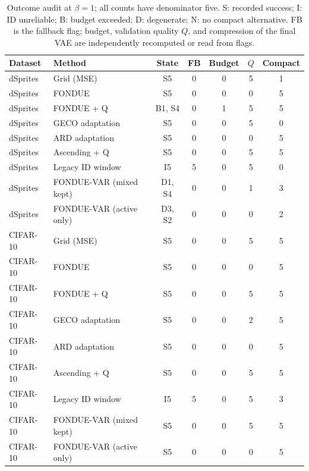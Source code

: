 \begin{table}[H]
\caption{Outcome audit at $\beta=1$; all counts have denominator five. S: recorded success; I: ID unreliable; B: budget exceeded; D: degenerate; N: no compact alternative. FB is the fallback flag; budget, validation quality $Q$, and compression of the final VAE are independently recomputed or read from flags.}\label{tab:outcomes1}
\footnotesize
\setlength{\tabcolsep}{3.5pt}
\begin{tabular*}{\textwidth}{@{\extracolsep{\fill}}llccccc@{}}
\toprule
Dataset & Method & State & FB & Budget & $Q$ & Compact \\
\midrule
dSprites & Grid (MSE) & S5 & 0 & 0 & 5 & 1 \\
dSprites & FONDUE & S5 & 0 & 0 & 0 & 5 \\
dSprites & FONDUE + Q & B1, S4 & 0 & 1 & 5 & 5 \\
dSprites & GECO adaptation & S5 & 0 & 0 & 5 & 0 \\
dSprites & ARD adaptation & S5 & 0 & 0 & 0 & 5 \\
dSprites & Ascending + Q & S5 & 0 & 0 & 5 & 5 \\
dSprites & Legacy ID window & I5 & 5 & 0 & 5 & 0 \\
dSprites & FONDUE-VAR (mixed kept) & D1, S4 & 0 & 0 & 1 & 3 \\
dSprites & FONDUE-VAR (active only) & D3, S2 & 0 & 0 & 0 & 2 \\
CIFAR-10 & Grid (MSE) & S5 & 0 & 0 & 5 & 5 \\
CIFAR-10 & FONDUE & S5 & 0 & 0 & 0 & 5 \\
CIFAR-10 & FONDUE + Q & S5 & 0 & 0 & 5 & 5 \\
CIFAR-10 & GECO adaptation & S5 & 0 & 0 & 2 & 5 \\
CIFAR-10 & ARD adaptation & S5 & 0 & 0 & 0 & 5 \\
CIFAR-10 & Ascending + Q & S5 & 0 & 0 & 5 & 5 \\
CIFAR-10 & Legacy ID window & I5 & 5 & 0 & 5 & 3 \\
CIFAR-10 & FONDUE-VAR (mixed kept) & S5 & 0 & 0 & 5 & 5 \\
CIFAR-10 & FONDUE-VAR (active only) & S5 & 0 & 0 & 0 & 5 \\
\bottomrule
\end{tabular*}
\end{table}
